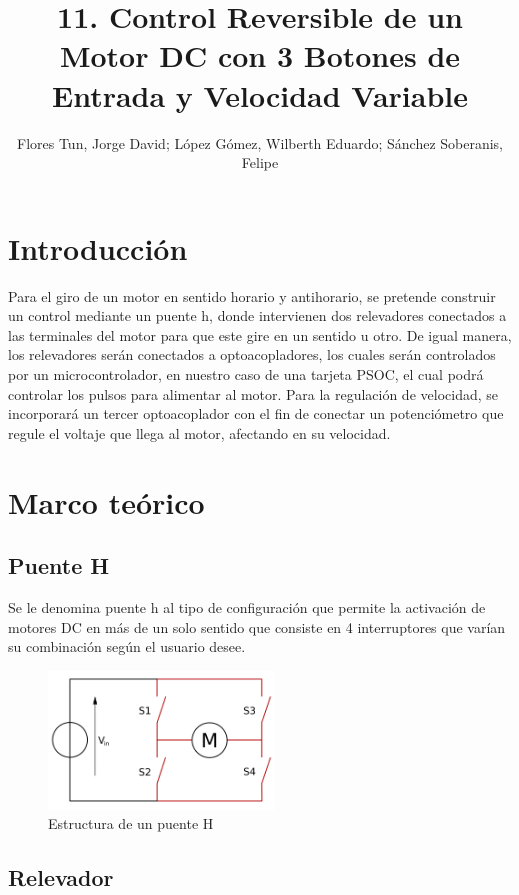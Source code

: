 \documentclass[]{article}
\title{11. Control Reversible de un Motor DC con 3 Botones de Entrada y Velocidad Variable}
\author{Flores Tun, Jorge David; López Gómez, Wilberth Eduardo; Sánchez Soberanis, Felipe}
\begin{document}
\maketitle

\section{Introducción}

Para el giro de un motor en sentido horario y antihorario, se pretende construir un control mediante un puente h, donde intervienen dos relevadores conectados a las terminales
del motor para que este gire en un sentido u otro. De igual manera, los relevadores serán conectados a optoacopladores, los cuales serán controlados por un microcontrolador, en nuestro
caso de una tarjeta PSOC, el cual podrá controlar los pulsos para alimentar al motor. Para la regulación de velocidad, se incorporará un tercer optoacoplador con el fin de conectar 
un potenciómetro que regule el voltaje que llega al motor, afectando en su velocidad.
\section{Marco teórico}

\subsection{Puente H}

Se le denomina puente h al tipo de configuración que permite la activación de motores DC en más de un solo sentido que consiste en 4 interruptores que varían su combinación según 
el usuario desee.

\begin{figure}[htb]
    \centering
    \includegraphics[width=6cm]{Imagenes/H.png}
    \caption{Estructura de un puente H}
\end{figure}

\subsection{Relevador}
\end{document}
